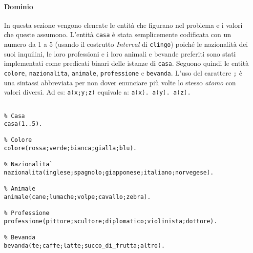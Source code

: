 \paragraph{Dominio}
In questa sezione vengono elencate le entità che figurano nel problema e i valori che queste assumono.
L'entità \texttt{casa} è stata semplicemente codificata con un numero da 1 a 5 (usando il costrutto \emph{Interval} di \texttt{clingo}) poiché le nazionalità dei suoi inquilini, le loro professioni e i loro animali e bevande preferiti sono stati implementati come predicati binari delle istanze di \texttt{casa}. Seguono quindi le entità \texttt{colore}, \texttt{nazionalita}, \texttt{animale}, \texttt{professione} e \texttt{bevanda}. L'uso del carattere \texttt{;} è una sintassi abbreviata per non dover enunciare più volte lo stesso \emph{atomo} con valori diversi. Ad es: \texttt{a(x;y;z)} equivale a: \texttt{a(x). a(y). a(z).}
\clearpage{}
\begin{lstlisting}[frame=tb]
%% Dominio

% Casa
casa(1..5).

% Colore
colore(rossa;verde;bianca;gialla;blu).

% Nazionalita`
nazionalita(inglese;spagnolo;giapponese;italiano;norvegese).

% Animale
animale(cane;lumache;volpe;cavallo;zebra).

% Professione
professione(pittore;scultore;diplomatico;violinista;dottore).

% Bevanda
bevanda(te;caffe;latte;succo_di_frutta;altro).
\end{lstlisting}
